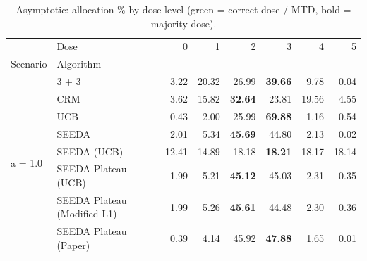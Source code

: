 \begin{table}[H]
\centering
\caption{Asymptotic: allocation \% by dose level (green = correct dose / MTD, bold = majority dose).}
\label{tab:asym_alloc_by_dose}
\begin{tabular}{llrrrrrr}
\toprule
 & Dose & 0 & 1 & 2 & 3 & 4 & 5 \\
Scenario & Algorithm &  &  &  &  &  &  \\
\midrule
\multirow[c]{8}{*}{a = 1.0} & 3 + 3 & 3.22 & 20.32 & {\cellcolor[HTML]{C8E6C9}} 26.99 & \bfseries 39.66 & 9.78 & 0.04 \\
 & CRM & 3.62 & 15.82 & {\cellcolor[HTML]{C8E6C9}} \bfseries 32.64 & 23.81 & 19.56 & 4.55 \\
 & UCB & 0.43 & 2.00 & {\cellcolor[HTML]{C8E6C9}} 25.99 & \bfseries 69.88 & 1.16 & 0.54 \\
 & SEEDA & 2.01 & 5.34 & {\cellcolor[HTML]{C8E6C9}} \bfseries 45.69 & 44.80 & 2.13 & 0.02 \\
 & SEEDA (UCB) & 12.41 & 14.89 & {\cellcolor[HTML]{C8E6C9}} 18.18 & \bfseries 18.21 & 18.17 & 18.14 \\
 & SEEDA Plateau (UCB) & 1.99 & 5.21 & {\cellcolor[HTML]{C8E6C9}} \bfseries 45.12 & 45.03 & 2.31 & 0.35 \\
 & SEEDA Plateau (Modified L1) & 1.99 & 5.26 & {\cellcolor[HTML]{C8E6C9}} \bfseries 45.61 & 44.48 & 2.30 & 0.36 \\
 & SEEDA Plateau (Paper) & 0.39 & 4.14 & {\cellcolor[HTML]{C8E6C9}} 45.92 & \bfseries 47.88 & 1.65 & 0.01 \\
\bottomrule
\end{tabular}
\end{table}
